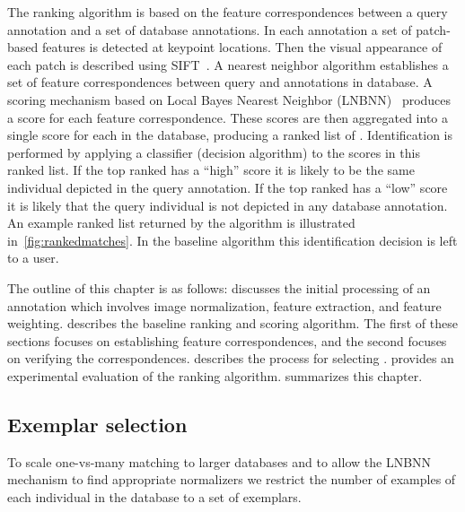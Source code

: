     The ranking algorithm is based on the feature correspondences between a
      query annotation and a set of database annotations.
    In each annotation a set of patch-based features is detected at keypoint
      locations.
    Then the visual appearance of each patch is described using
      SIFT~\cite{lowe_distinctive_2004}.
    A nearest neighbor algorithm establishes a set of feature correspondences
      between query and annotations in database.
    A scoring mechanism based on Local \Naive{} Bayes Nearest Neighbor
      (LNBNN)~\cite{mccann_local_2012} produces a score for each feature
      correspondence.
    These scores are then aggregated into a single score for each \name{} in
      the database, producing a ranked list of \names{}.
    Identification is performed by applying a classifier (decision algorithm)
      to the scores in this ranked list.
    If the top ranked \name{} has a ``high'' score it is likely to be the same
      individual depicted in the query annotation.
    If the top ranked \name{} has a ``low'' score it is likely that the query
      individual is not depicted in any database annotation.
    An example ranked list returned by the algorithm is illustrated
      in~\cref{fig:rankedmatches}.
    In the baseline algorithm this identification decision is left to a user.

    The outline of this chapter is as follows:
     discusses the initial processing of an annotation
      which involves image normalization, feature extraction, and feature
      weighting.
     describes the baseline ranking and
      scoring algorithm.
    The first of these sections focuses on establishing feature
      correspondences, and the second focuses on verifying the correspondences.
     describes the process for selecting \exemplars{}.
     provides an experimental evaluation of the ranking
      algorithm.
     summarizes this chapter.

    \rankedmatches{}

    
    
    


\subsection{Exemplar selection}\label{sec:exempselect}
    To scale one-vs-many matching to larger databases and to allow the LNBNN
    mechanism to find appropriate normalizers we restrict the number of
    examples of each individual in the database to a set of exemplars.

